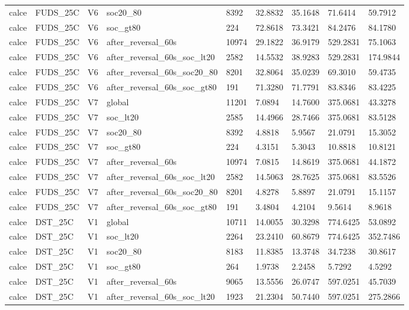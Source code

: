 \begin{tabular}{lllllllll}
calce & FUDS\_25C & V6 & soc20\_80 & 8392 & 32.8832 & 35.1648 & 71.6414 & 59.7912 \\
calce & FUDS\_25C & V6 & soc\_gt80 & 224 & 72.8618 & 73.3421 & 84.2476 & 84.1780 \\
calce & FUDS\_25C & V6 & after\_reversal\_60s & 10974 & 29.1822 & 36.9179 & 529.2831 & 75.1063 \\
calce & FUDS\_25C & V6 & after\_reversal\_60s\_soc\_lt20 & 2582 & 14.5532 & 38.9283 & 529.2831 & 174.9844 \\
calce & FUDS\_25C & V6 & after\_reversal\_60s\_soc20\_80 & 8201 & 32.8064 & 35.0239 & 69.3010 & 59.4735 \\
calce & FUDS\_25C & V6 & after\_reversal\_60s\_soc\_gt80 & 191 & 71.3280 & 71.7791 & 83.8346 & 83.4225 \\
calce & FUDS\_25C & V7 & global & 11201 & 7.0894 & 14.7600 & 375.0681 & 43.3278 \\
calce & FUDS\_25C & V7 & soc\_lt20 & 2585 & 14.4966 & 28.7466 & 375.0681 & 83.5128 \\
calce & FUDS\_25C & V7 & soc20\_80 & 8392 & 4.8818 & 5.9567 & 21.0791 & 15.3052 \\
calce & FUDS\_25C & V7 & soc\_gt80 & 224 & 4.3151 & 5.3043 & 10.8818 & 10.8121 \\
calce & FUDS\_25C & V7 & after\_reversal\_60s & 10974 & 7.0815 & 14.8619 & 375.0681 & 44.1872 \\
calce & FUDS\_25C & V7 & after\_reversal\_60s\_soc\_lt20 & 2582 & 14.5063 & 28.7625 & 375.0681 & 83.5526 \\
calce & FUDS\_25C & V7 & after\_reversal\_60s\_soc20\_80 & 8201 & 4.8278 & 5.8897 & 21.0791 & 15.1157 \\
calce & FUDS\_25C & V7 & after\_reversal\_60s\_soc\_gt80 & 191 & 3.4804 & 4.2104 & 9.5614 & 8.9618 \\
calce & DST\_25C & V1 & global & 10711 & 14.0055 & 30.3298 & 774.6425 & 53.0892 \\
calce & DST\_25C & V1 & soc\_lt20 & 2264 & 23.2410 & 60.8679 & 774.6425 & 352.7486 \\
calce & DST\_25C & V1 & soc20\_80 & 8183 & 11.8385 & 13.3748 & 34.7238 & 30.8617 \\
calce & DST\_25C & V1 & soc\_gt80 & 264 & 1.9738 & 2.2458 & 5.7292 & 4.5292 \\
calce & DST\_25C & V1 & after\_reversal\_60s & 9065 & 13.5556 & 26.0747 & 597.0251 & 45.7039 \\
calce & DST\_25C & V1 & after\_reversal\_60s\_soc\_lt20 & 1923 & 21.2304 & 50.7440 & 597.0251 & 275.2866 \\

\end{tabular}
